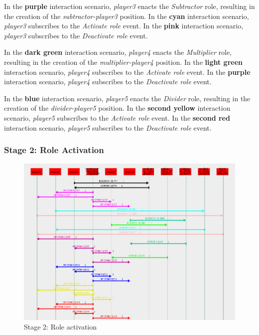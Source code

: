 In the \textbf{purple} interaction scenario, \textit{player3} enacts the \textit{Subtractor} role, resulting in the creation of the \textit{subtractor-player3} position.
In the \textbf{cyan} interaction scenario, \textit{player3} subscribes to the \textit{Activate role} event.
In the \textbf{pink} interaction scenario, \textit{player3} subscribes to the \textit{Deactivate role} event.

In the \textbf{dark green} interaction scenario, \textit{player4} enacts the \textit{Multiplier} role, resulting in the creation of the \textit{multiplier-player4} position.
In the \textbf{light green} interaction scenario, \textit{player4} subscribes to the \textit{Activate role} event.
In the \textbf{purple} interaction scenario, \textit{player4} subscribes to the \textit{Deactivate role} event.

In the \textbf{blue} interaction scenario, \textit{player5} enacts the \textit{Divider} role, resulting in the creation of the \textit{divider-player5} position.
In the \textbf{second yellow} interaction scenario, \textit{player5} subscribes to the \textit{Activate role} event.
In the \textbf{second red} interaction scenario, \textit{player5} subscribes to the \textit{Deactivate role} event.

\subsubsection*{Stage 2: Role Activation}

\begin{figure}[H]
	\centering
	\includegraphics[width=\textwidth]{images/examples/example2-stage2.png}
	\caption{Stage 2: Role activation}
	\label{figure:example2-stage2}
\end{figure}

